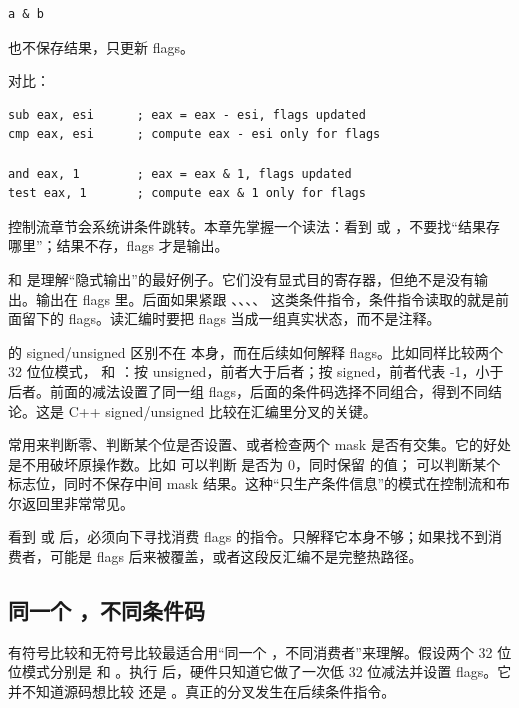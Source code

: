 \begin{lstlisting}
a & b
\end{lstlisting}

也不保存结果，只更新 flags。

对比：

\begin{lstlisting}
sub eax, esi      ; eax = eax - esi, flags updated
cmp eax, esi      ; compute eax - esi only for flags

and eax, 1        ; eax = eax & 1, flags updated
test eax, 1       ; compute eax & 1 only for flags
\end{lstlisting}

控制流章节会系统讲条件跳转。本章先掌握一个读法：看到  或 ，不要找“结果存哪里”；结果不存，flags 才是输出。

 和  是理解“隐式输出”的最好例子。它们没有显式目的寄存器，但绝不是没有输出。输出在 flags 里。后面如果紧跟 、、、、 这类条件指令，条件指令读取的就是前面留下的 flags。读汇编时要把 flags 当成一组真实状态，而不是注释。

 的 signed/unsigned 区别不在  本身，而在后续如何解释 flags。比如同样比较两个 32 位位模式， 和 ：按 unsigned，前者大于后者；按 signed，前者代表 -1，小于后者。前面的减法设置了同一组 flags，后面的条件码选择不同组合，得到不同结论。这是 C++ signed/unsigned 比较在汇编里分叉的关键。

 常用来判断零、判断某个位是否设置、或者检查两个 mask 是否有交集。它的好处是不用破坏原操作数。比如  可以判断  是否为 0，同时保留  的值； 可以判断某个标志位，同时不保存中间 mask 结果。这种“只生产条件信息”的模式在控制流和布尔返回里非常常见。

\begin{warningbox}
看到  或  后，必须向下寻找消费 flags 的指令。只解释它本身不够；如果找不到消费者，可能是 flags 后来被覆盖，或者这段反汇编不是完整热路径。
\end{warningbox}

\subsection{同一个 ，不同条件码}

有符号比较和无符号比较最适合用“同一个 ，不同消费者”来理解。假设两个 32 位位模式分别是  和 。执行  后，硬件只知道它做了一次低 32 位减法并设置 flags。它并不知道源码想比较  还是 。真正的分叉发生在后续条件指令。

